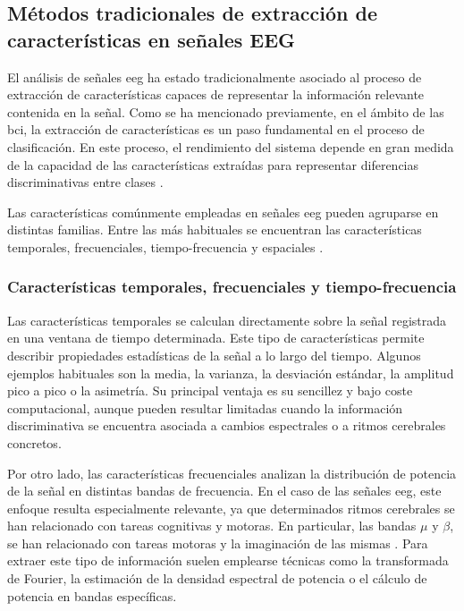 \subsection{Métodos tradicionales de extracción de características en señales EEG} \label{sec:metodos_tradicionales}

El análisis de señales \acrshort{eeg} ha estado tradicionalmente asociado al proceso de extracción de características capaces de representar la información relevante contenida en la señal. Como se ha mencionado previamente, en el ámbito de las \acrshort{bci}, la extracción de características es un paso fundamental en el proceso de clasificación. En este proceso, el rendimiento del sistema depende en gran medida de la capacidad de las características extraídas para representar diferencias discriminativas entre clases \cite{krishnan_TrendsBiomedical2018,yuvaraj_ComprehensiveAnalysis2023, subasi_Chapter42019}.

Las características comúnmente empleadas en señales \acrshort{eeg} pueden agruparse en distintas familias. Entre las más habituales se encuentran las características temporales, frecuenciales, tiempo-frecuencia y espaciales \cite{krishnan_TrendsBiomedical2018,stancin_ReviewEEG2021,siuly_EEGSignal2016}.

\subsubsection{Características temporales, frecuenciales y tiempo-frecuencia}

Las características temporales se calculan directamente sobre la señal registrada en una ventana de tiempo determinada. Este tipo de características permite describir propiedades estadísticas de la señal a lo largo del tiempo. Algunos ejemplos habituales son la media, la varianza, la desviación estándar, la amplitud pico a pico o la asimetría. Su principal ventaja es su sencillez y bajo coste computacional, aunque pueden resultar limitadas cuando la información discriminativa se encuentra asociada a cambios espectrales o a ritmos cerebrales concretos.

Por otro lado, las características frecuenciales analizan la distribución de potencia de la señal en distintas bandas de frecuencia. En el caso de las señales \acrshort{eeg}, este enfoque resulta especialmente relevante, ya que determinados ritmos cerebrales se han relacionado con tareas cognitivas y motoras. En particular, las bandas \(\mu\) y \(\beta\), se han relacionado con tareas motoras y la imaginación de las mismas \cite{mirnaziri_UsingCombination2013}. Para extraer este tipo de información suelen emplearse técnicas como la transformada de Fourier, la estimación de la densidad espectral de potencia o el cálculo de potencia en bandas específicas.

